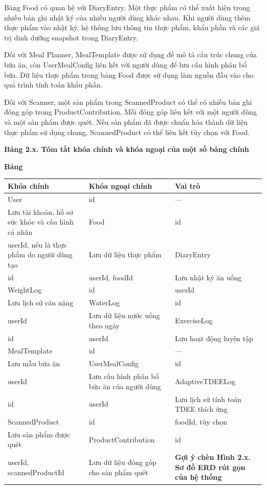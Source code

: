 Bảng Food có quan hệ với DiaryEntry. Một thực phẩm có thể xuất hiện trong nhiều bản ghi nhật ký của nhiều người dùng khác nhau. Khi người dùng thêm thực phẩm vào nhật ký, hệ thống lưu thông tin thực phẩm, khẩu phần và các giá trị dinh dưỡng snapshot trong DiaryEntry.

Đối với Meal Planner, MealTemplate được sử dụng để mô tả cấu trúc chung của bữa ăn, còn UserMealConfig liên kết với người dùng để lưu cấu hình phân bổ bữa. Dữ liệu thực phẩm trong bảng Food được sử dụng làm nguồn đầu vào cho quá trình tính toán khẩu phần.

Đối với Scanner, một sản phẩm trong ScannedProduct có thể có nhiều bản ghi đóng góp trong ProductContribution. Mỗi đóng góp liên kết với một người dùng và một sản phẩm được quét. Nếu sản phẩm đã được chuẩn hóa thành dữ liệu thực phẩm sử dụng chung, ScannedProduct có thể liên kết tùy chọn với Food.

\textbf{Bảng 2.x. Tóm tắt khóa chính và khóa ngoại của một số bảng chính}

\begin{table}[H]
\centering
\textbf{Bảng}
\begin{tabular}{|p{4cm}|p{5.5cm}|p{5.5cm}|}
\hline
\textbf{Khóa chính} & \textbf{Khóa ngoại chính} & \textbf{Vai trò} \\ \hline
User & id & — \\ \hline
Lưu tài khoản, hồ sơ sức khỏe và cấu hình cá nhân & Food & id \\ \hline
userId, nếu là thực phẩm do người dùng tạo & Lưu dữ liệu thực phẩm & DiaryEntry \\ \hline
id & userId, foodId & Lưu nhật ký ăn uống \\ \hline
WeightLog & id & userId \\ \hline
Lưu lịch sử cân nặng & WaterLog & id \\ \hline
userId & Lưu dữ liệu nước uống theo ngày & ExerciseLog \\ \hline
id & userId & Lưu hoạt động luyện tập \\ \hline
MealTemplate & id & — \\ \hline
Lưu mẫu bữa ăn & UserMealConfig & id \\ \hline
userId & Lưu cấu hình phân bổ bữa ăn của người dùng & AdaptiveTDEELog \\ \hline
id & userId & Lưu lịch sử tính toán TDEE thích ứng \\ \hline
ScannedProduct & id & foodId, tùy chọn \\ \hline
Lưu sản phẩm được quét & ProductContribution & id \\ \hline
userId, scannedProductId & Lưu dữ liệu đóng góp cho sản phẩm quét & \textbf{Gợi ý chèn Hình 2.x. Sơ đồ ERD rút gọn của hệ thống} \\ \hline
\end{tabular}
\end{table}

